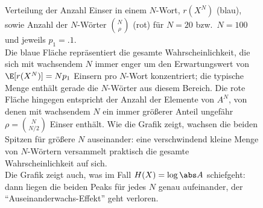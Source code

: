 \begin{figure}
  \centering
    \caption{Verteilung der Anzahl Einser in einem $N$-Wort, $r(X^N)$ (blau), sowie Anzahl der $N$-Wörter $\binom N ρ$ (rot) für $N=20$ bzw.\ $N=100$ und jeweils $p_1=\num{.1}$.\\
    Die blaue Fläche repräsentiert die gesamte Wahrscheinlichkeit, die sich mit wachsendem $N$ immer enger um den Erwartungswert von $\E[r(X^N)] = Np_1$ Einsern pro $N$-Wort konzentriert; die typische Menge enthält gerade die $N$-Wörter aus diesem Bereich. Die rote Fläche hingegen entspricht der Anzahl der Elemente von $A^N$, von denen mit wachsendem $N$ ein immer größerer Anteil ungefähr $ρ=\binom N {N/2}$ Einser enthält. Wie die Grafik zeigt, wachsen die beiden Spitzen für größere $N$ auseinander: eine verschwindend kleine Menge von $N$-Wörtern versammelt praktisch die gesamte Wahrscheinlichkeit auf sich.\\
    Die Grafik zeigt auch, was im Fall $H(X)=\log \abs A$ schiefgeht: dann liegen die beiden Peaks für jedes $N$ genau aufeinander, der \enquote{Auseinanderwachs-Effekt} geht verloren.}
    \label{fig:typicality}
\end{figure}

